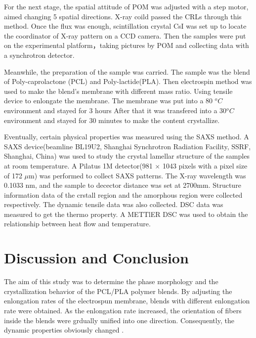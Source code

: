 \documentclass[a4paper,sans]{article}
\begin{document}
	For the next stage, the spatial attitude of POM was adjusted with a step motor, aimed changing 5 spatial directions. X-ray coild passed the CRLs through this method. Once the flux was enough, scintillation crystal CsI was set up to locate the coordinator of X-ray pattern on a CCD camera. Then the samples were put on the experimental platform，taking pictures by POM and collecting data with a synchrotron detector.\cite{RN42}


	Meanwhile, the preparation of the sample was carried. The sample was the blend of Poly-caprolactone (PCL) and Poly-lactide(PLA). Then electrospin method was used to make the blend's membrane with different mass ratio. Using tensile device to enlongate the membrane. The membrane was put into a 80 $^{o}C$ environment and stayed for 3 hours After that it was transfered into a 30$^{o}C$ environment and stayed for 30 minutes to make the content crystallize.\cite{RN38}


	Eventually, certain physical properties was measured using the SAXS method.
	A SAXS device(beamline BL19U2, Shanghai Synchrotron Radiation Facility, SSRF, Shanghai, China) was used to study the crystal lamellar structure of the samples at room temperature.
	 A Pilatus 1M detector(981 $\times$ 1043 pixels with a pixel size of 172 $\mu$m) was performed to collect SAXS patterns. 
	The X-ray wavelength was 0.1033 nm, and the sample to decector distance was set at 2700mm.
	 Structure information data of the crstall region and the amorphous region were collected respectively. 
	 The dynamic tensile data was also collected. 
	 DSC data was measured to get the thermo property.\cite{RN102} A METTlER DSC was used to obtain the relationship between heat flow and temperature.
	
	
	\section{Discussion and Conclusion} %
	\label{sec:discussion_and_conclusion}
		The aim of this study was to determine the phase morphology and the crystallization behavior of the PCL/PLA polymer blends.
		By adjusting the enlongation rates of the electrospun membrane, blends with different enlongation rate were obtained. 
		As the enlongation rate increased, the orientation of fibers inside the blends were grdually unified into one direction. Consequently, the dynamic properties obviously changed . 
\end{document}

